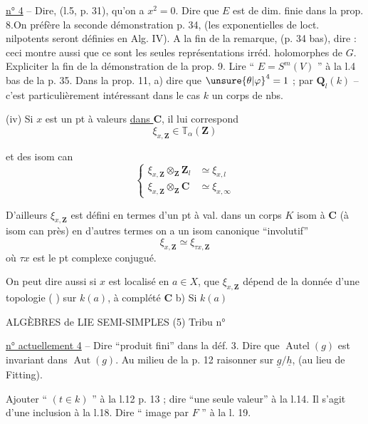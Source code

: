 \uline{n° 4} -- Dire, (l.5, p. 31), qu'on a $x^2=0$. Dire que $E$ est de dim. finie dans la prop. 8.On préfère la seconde démonstration p. 34, (les exponentielles de loct. nilpotents seront définies en Alg. IV). A la fin de la remarque, (p. 34 bas), dire : ceci montre aussi que ce sont les seules représentations irréd. holomorphes de $G$. Expliciter la fin de la démonstration de la prop. 9. Lire `` $E=S^m(V)$ '' à la l.4 bas de la p. 35. Dans la prop. 11, a) dire que $\unsure{\theta|\varphi}^4=1$ ;
par $\mathbf Q_l(k)$ -- c'est particulièrement intéressant dans le cas $k$ un corps de nbs.

(iv) Si $x$ est un pt à valeurs \uline{dans $\mathbf C$}, il lui correspond
\[
\xi_{x,\mathbf Z}\in\mathbb T_\alpha(\mathbf Z)
\]

et des isom can
\[
\left\{\begin{aligned}
\xi_{x,\mathbf Z}\otimes_{\mathbf Z}\mathbf Z_l&\simeq\xi_{x,l}\\
\xi_{x,\mathbf Z}\otimes_{\mathbf Z}\mathbf C&\simeq\xi_{x,\infty}
\end{aligned}\right.
\]

D'ailleurs $\xi_{x,\mathbf Z}$ est défini en termes d'un pt à val. dans un corps  $K$ isom à $\mathbf C$ (à isom can près) en d'autres termes on a un isom canonique ``involutif''
\[
\xi_{x,\mathbf Z}\simeq\xi_{\tau x,\mathbf Z}
\]
où $\tau x$ est le pt complexe conjugué.

 On peut dire aussi si $x$ est localisé en $a\in X$, que  $\xi_{x,\mathbf Z}$ dépend de la donnée d'une topologie ( ) sur $k(a)$, à complété $\mathbf C$ \quad b) Si $k(a)$ 


ALGÈBRES de LIE SEMI-SIMPLES (5) \hfill Tribu n° 

\uline{n° actuellement 4} -- Dire ``produit fini'' dans la déf. 3. Dire que $\operatorname{Autel}(g)$ est invariant dans $\operatorname{Aut}(g)$. Au milieu de la p. 12 raisonner sur $\underline{g}/\underline{h}$, (au lieu de Fitting).

Ajouter `` $(t\in k)$ '' à la l.12 p. 13 ; dire ``une seule valeur'' à la l.14. Il s'agit d'une inclusion à la l.18. Dire `` image par $F$ '' à la l. 19.

